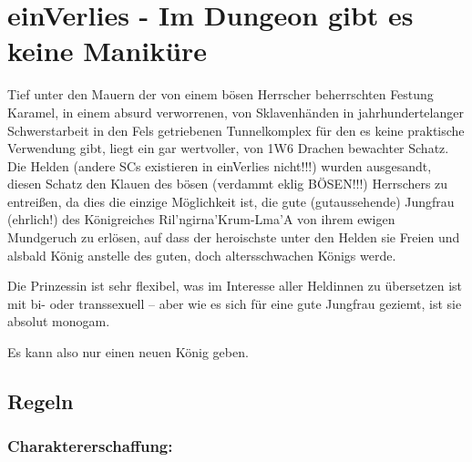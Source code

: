 
\section{einVerlies - Im Dungeon gibt es keine Maniküre}
\label{sect:einVerlies}
Tief unter den Mauern der von einem bösen Herrscher beherrschten Festung Karamel, in einem absurd verworrenen, von Sklavenhänden in jahrhundertelanger Schwerstarbeit in den Fels getriebenen Tunnelkomplex für den es keine praktische Verwendung gibt, liegt ein gar wertvoller, von 1W6 Drachen bewachter Schatz. Die Helden (andere SCs existieren in einVerlies nicht!!!) wurden ausgesandt, diesen Schatz den Klauen des bösen (verdammt eklig BÖSEN!!!) Herrschers zu entreißen, da dies die einzige Möglichkeit ist, die gute (gutaussehende) Jungfrau (ehrlich!) des Königreiches Ril'ngirna'Krum-Lma'A von ihrem ewigen Mundgeruch zu erlösen, auf dass der heroischste unter den Helden sie Freien und alsbald König anstelle des guten, doch altersschwachen Königs werde.

Die Prinzessin ist sehr flexibel, was im Interesse aller Heldinnen zu übersetzen ist mit bi- oder transsexuell -- aber wie es sich für eine gute Jungfrau geziemt, ist sie absolut monogam.

Es kann also nur einen neuen König geben.

 

\subsection{Regeln}

\subsubsection{Charaktererschaffung:}

